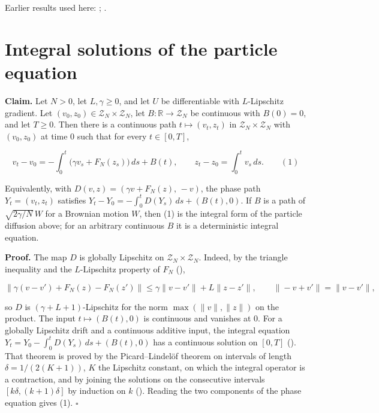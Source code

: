 \documentclass[11pt,a4paper]{article}
\begin{document}
Earlier results used here: \cite[Section~3.1.1]{LangevinLean2026IPLA}; \cite[Section~3.1.3]{LangevinLean2026IPLA}.

\section{\texorpdfstring{Integral solutions of the particle equation}{Integral solutions of the particle equation}}


\textbf{Claim.} Let \(N>0\), let \(L,\gamma\ge0\), and let \(U\) be differentiable with \(L\)-Lipschitz gradient. Let \((v_0,z_0)\in\mathcal Z_N\times\mathcal Z_N\), let \(B:\mathbb R\to\mathcal Z_N\) be continuous with \(B(0)=0\), and let \(T\ge0\). Then there is a continuous path \(t\mapsto(v_t,z_t)\) in \(\mathcal Z_N\times\mathcal Z_N\) with \((v_0,z_0)\) at time \(0\) such that for every \(t\in[0,T]\),


\[v_t-v_0=-\int_0^t\bigl(\gamma v_s+F_N(z_s)\bigr)\,ds+B(t),\qquad z_t-z_0=\int_0^tv_s\,ds.\qquad(1)\]


Equivalently, with \(D(v,z)=(\gamma v+F_N(z),\,-v)\), the phase path \(Y_t=(v_t,z_t)\) satisfies \(Y_t-Y_0=-\int_0^tD(Y_s)\,ds+(B(t),0)\). If \(B\) is a path of \(\sqrt{2\gamma/N}\,W\) for a Brownian motion \(W\), then (1) is the integral form of the particle diffusion above; for an arbitrary continuous \(B\) it is a deterministic integral equation.




\textbf{Proof.} The map \(D\) is globally Lipschitz on \(\mathcal Z_N\times\mathcal Z_N\). Indeed, by the triangle inequality and the \(L\)-Lipschitz property of \(F_N\) (\cite[Section~3.1.5]{LangevinLean2026KIPLMC}),


\[\|\gamma(v-v')+F_N(z)-F_N(z')\|\le\gamma\|v-v'\|+L\|z-z'\|,\qquad\|-v+v'\|=\|v-v'\|,\]


so \(D\) is \((\gamma+L+1)\)-Lipschitz for the norm \(\max(\|v\|,\|z\|)\) on the product. The input \(t\mapsto(B(t),0)\) is continuous and vanishes at \(0\). For a globally Lipschitz drift and a continuous additive input, the integral equation \(Y_t=Y_0-\int_0^tD(Y_s)\,ds+(B(t),0)\) has a continuous solution on \([0,T]\) (\cite[Section~3.1.3]{LangevinLean2026Kinetic}). That theorem is proved by the Picard–Lindelöf theorem on intervals of length \(\delta=1/(2(K+1))\), \(K\) the Lipschitz constant, on which the integral operator is a contraction, and by joining the solutions on the consecutive intervals \([k\delta,(k+1)\delta]\) by induction on \(k\) (\cite[Section~3.14.3]{LangevinLean2026ULASC}). Reading the two components of the phase equation gives (1). \(\square\)
\end{document}
